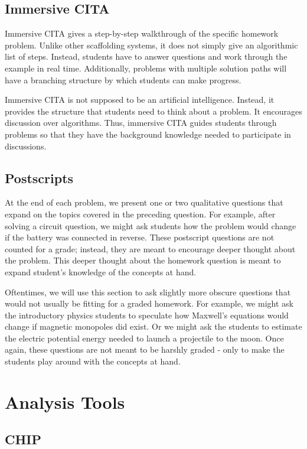 \subsection{Immersive CITA}

Immersive CITA gives a step-by-step walkthrough of the specific homework problem. Unlike other scaffolding systems, it does not simply give an algorithmic list of steps. Instead, students have to answer questions and work through the example in real time. Additionally, problems with multiple solution paths will have a branching structure by which students can make progress.

Immersive CITA is not supposed to be an artificial intelligence. Instead, it provides the structure that students need to think about a problem. It encourages discussion over algorithms. Thus, immersive CITA guides students through problems so that they have the background knowledge needed to participate in discussions.

\subsection{Postscripts}

At the end of each problem, we present one or two qualitative questions that expand on the topics covered in the preceding question. For example, after solving a circuit question, we might ask students how the problem would change if the battery was connected in reverse. These postscript questions are not counted for a grade; instead, they are meant to encourage deeper thought about the problem. This deeper thought about the homework question is meant to expand student’s knowledge of the concepts at hand.

Oftentimes, we will use this section to ask slightly more obscure questions that would not usually be fitting for a graded homework. For example, we might ask the introductory physics students to speculate how Maxwell's equations would change if magnetic monopoles did exist. Or we might ask the students to estimate the electric potential energy needed to launch a projectile to the moon. Once again, these questions are not meant to be harshly graded - only to make the students play around with the concepts at hand.

\section{Analysis Tools}

\subsection{CHIP}

